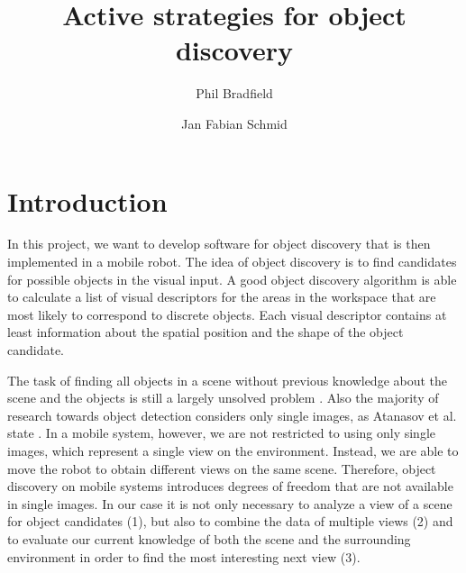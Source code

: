 \documentclass[a4paper,11pt,english]{article}
\begin{document}
\title{Active strategies for object discovery}
\author{Phil Bradfield \and Jan Fabian Schmid}
	
\maketitle 

\section{Introduction}\label{intro}
In this project, we want to develop software for object discovery that is then implemented in a mobile robot.
The idea of object discovery is to find candidates for possible objects in the visual input.
A good object discovery algorithm is able to calculate a list of visual descriptors for the areas in the workspace that are most likely to correspond to discrete objects.
Each visual descriptor contains at least information about the spatial position and the shape of the object candidate.

The task of finding all objects in a scene without previous knowledge about the scene and the objects is still a largely unsolved problem \cite{garcia2013computational}.
Also the majority of research towards object detection considers only single images, as Atanasov et al. state \cite{atanasov2014nonmyopic}.
In a mobile system, however, we are not restricted to using only single images, which represent a single view on the environment.
Instead, we are able to move the robot to obtain different views on the same scene.
Therefore, object discovery on mobile systems introduces degrees of freedom that are not available in single images.
In our case it is not only necessary to analyze a view of a scene for object candidates (1), but also to combine the data of multiple views (2) and to evaluate our current knowledge of both the scene and the surrounding environment in order to find the most interesting next view (3).
\end{document}
